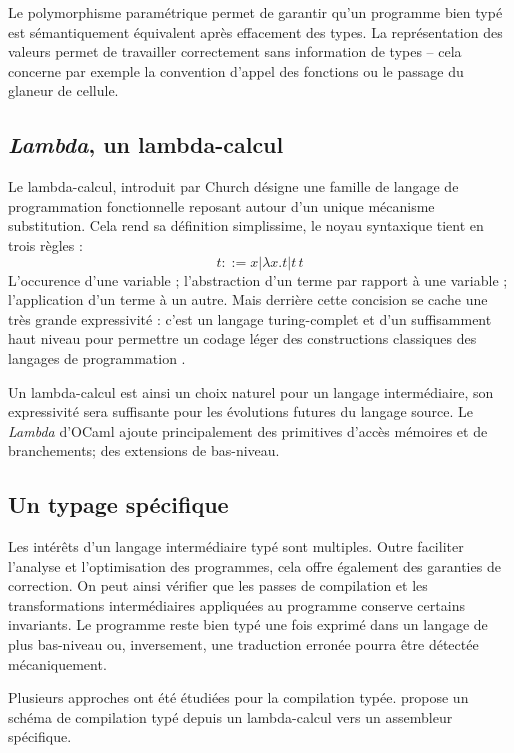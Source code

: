 Le polymorphisme paramétrique permet de garantir qu'un programme bien typé est
sémantiquement équivalent après effacement des types. %
La représentation des valeurs permet de travailler correctement sans
information de types -- cela concerne par exemple la convention d'appel des
fonctions ou le passage du glaneur de cellule.

\subsection{\emph{Lambda}, un lambda-calcul}


Le lambda-calcul, introduit par Church désigne une famille de langage de
programmation fonctionnelle reposant autour d'un unique mécanisme substitution.
Cela rend sa définition simplissime, le noyau syntaxique tient en trois règles :
$$t ::= x | \lambda x . t | t \, t$$
L'occurence d'une variable ; l'abstraction d'un terme par rapport à une variable ;
l'application d'un terme à un autre.
Mais derrière cette concision se cache une très grande expressivité : c'est un
langage turing-complet et d'un suffisamment haut niveau pour permettre un
codage léger des constructions classiques des langages de programmation
\cite{Landin}.

Un lambda-calcul est ainsi un choix naturel pour un langage intermédiaire, son
expressivité sera suffisante pour les évolutions futures du langage source.
Le \emph{Lambda} d'OCaml ajoute principalement des primitives d'accès mémoires
et de branchements; des extensions de bas-niveau.

\subsection{Un typage spécifique}

Les intérêts d'un langage intermédiaire typé sont multiples. Outre faciliter
l'analyse et l'optimisation des programmes, cela offre également des garanties
de correction. On peut ainsi vérifier que les passes de compilation et les
transformations intermédiaires appliquées au programme conserve certains
invariants. Le programme reste bien typé une fois exprimé dans un langage de
plus bas-niveau ou, inversement, une traduction erronée pourra être détectée
mécaniquement.

Plusieurs approches ont été étudiées pour la compilation typée.
\cite{MorrisettWCG99} propose un schéma de compilation typé depuis un
lambda-calcul vers un assembleur spécifique.


